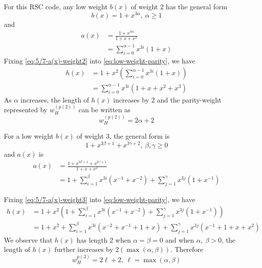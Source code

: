 \documentclass[11pt, oneside, dvipdfmx]{book}
\begin{document}
\begin{example}[5/7 RSC code, $f(x)=1+x^2,~g(x)=1+x+x^2$]
For this RSC code, any low weight $b(x)$ of weight 2 has the general form 
\begin{equation}
b(x)=1+x^{3\alpha},~\alpha \geq 1
\label{eq:5/7-weight-2}
\end{equation}
and 
\begin{equation}
\begin{split}
a(x)&=\frac{1+x^{3\alpha}}{1+x+x^2}\\
&=\sum_{i=0}^{\alpha-1}x^{3i}\left(1+x\right)
\end{split}
\label{eq:5/7-a(x)-weight2}
\end{equation}
Fixing \eqref{eq:5/7-a(x)-weight2} into \eqref{eq:low-weight-parity}, we have 
\begin{equation}
\begin{split}
h(x)&=1+x^2\left(\sum_{i=0}^{\alpha-1}x^{3i}\left(1+x\right)\right)\\
&=\sum_{i=0}^{\alpha-1}x^{3i}\left(1+x+x^2+x^3\right)
\end{split}
\label{eq:5/7-h(x)-weight2}
\end{equation}
As $\alpha$ increases, the length of $h(x)$ increases by $2$ and the parity-weight represented by $w_H^{(p(2))}$ can be written as $$w_H^{(p(2))}=2\alpha+2$$

For a low weight $b(x)$ of weight 3, the general form is 
\begin{equation}
1+x^{3\beta +1}+x^{3\gamma+2},~\beta,\gamma \geq 0
\label{eq:5/7-weight-3}
\end{equation}
and $a(x)$ is 
\begin{equation}
\begin{split}
a(x)&=\frac{1+x^{3\beta +1}+x^{3\gamma+1}}{1+x+x^2}\\
&=1+\sum_{i=1}^{\beta}x^{3i}\left(x^{-1}+x^{-2}\right) + \sum_{j=1}^{\gamma}x^{3j}\left(1+x^{-1}\right)
\end{split}
\label{eq:5/7-a(x)-weight3}
\end{equation}

Fixing \eqref{eq:5/7-a(x)-weight3} into \eqref{eq:low-weight-parity}, we have 
\begin{equation}
\begin{split}
h(x)&=1+x^2\left(1+\sum_{i=1}^{\beta}x^{3i}\left(x^{-1}+x^{-2}\right) + \sum_{j=1}^{\gamma}x^{3j}\left(1+x^{-1}\right)\right)\\
&=1+x^2+\sum_{i=1}^{\beta}x^{3i}\left(x^{-2}+x^{-1}+1+x\right) + \sum_{j=1}^{\gamma}x^{3j}\left(x^{-1}+1+x+x^2\right)
\end{split}
\label{eq:5/7-h(x)-weight-3}
\end{equation}
We observe that $h(x)$ has length 2 when $\alpha =\beta =0$ and when $\alpha,~\beta>0$, the length of $h(x)$ further increases by $2(\max(\alpha,\beta))$. Therefore
$$w_H^{p(3)}=2\ell+2,~\ell=\max(\alpha,\beta)$$

\end{example}
\end{document}
